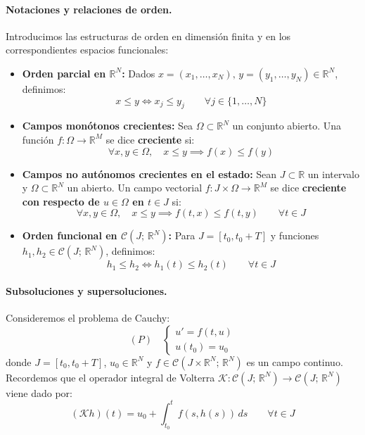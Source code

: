 \paragraph{Notaciones y relaciones de orden.}
Introducimos las estructuras de orden en dimensión finita y en los correspondientes espacios funcionales:
\begin{itemize}
    \item \textbf{Orden parcial en $\mathbb{R}^N$:} Dados $x = (x_1, \dots, x_N), \, y = (y_1, \dots, y_N) \in \mathbb{R}^N$, definimos:
    \[
        x \leq y \iff x_j \leq y_j \qquad \forall j \in \{1, \dots, N\}
    \]
    \item \textbf{Campos monótonos crecientes:} Sea $\Omega \subset \mathbb{R}^N$ un conjunto abierto. Una función $f: \Omega \to \mathbb{R}^M$ se dice \textbf{creciente} si:
    \[
        \forall x, y \in \Omega, \quad x \leq y \implies f(x) \leq f(y)
    \]
    \item \textbf{Campos no autónomos crecientes en el estado:} Sean $J \subset \mathbb{R}$ un intervalo y $\Omega \subset \mathbb{R}^N$ un abierto. Un campo vectorial $f: J \times \Omega \to \mathbb{R}^M$ se dice \textbf{creciente con respecto de $u \in \Omega$ en $t \in J$} si:
    \[
        \forall x, y \in \Omega, \quad x \leq y \implies f(t, x) \leq f(t, y) \qquad \forall t \in J
    \]
    \item \textbf{Orden funcional en $\mathcal{C}(J; \, \mathbb{R}^N)$:} Para $J = [t_0, t_0 + T]$ y funciones $h_1, h_2 \in \mathcal{C}(J; \, \mathbb{R}^N)$, definimos:
    \[
        h_1 \leq h_2 \iff h_1(t) \leq h_2(t) \qquad \forall t \in J
    \]
\end{itemize}

\paragraph{Subsoluciones y supersoluciones.}
Consideremos el problema de Cauchy:
\[
    (P) \quad
    \begin{cases}
        u' = f(t, u) \\
        u(t_0) = u_0
    \end{cases}
\]
donde $J = [t_0, t_0 + T]$, $u_0 \in \mathbb{R}^N$ y $f \in \mathcal{C}(J \times \mathbb{R}^N; \, \mathbb{R}^N)$ es un campo continuo.
Recordemos que el operador integral de Volterra $\mathcal{K}: \mathcal{C}(J; \, \mathbb{R}^N) \to \mathcal{C}(J; \, \mathbb{R}^N)$ viene dado por:
\[
    (\mathcal{K}h)(t) = u_0 + \int_{t_0}^t f(s, h(s)) \, ds \qquad \forall t \in J
\]

